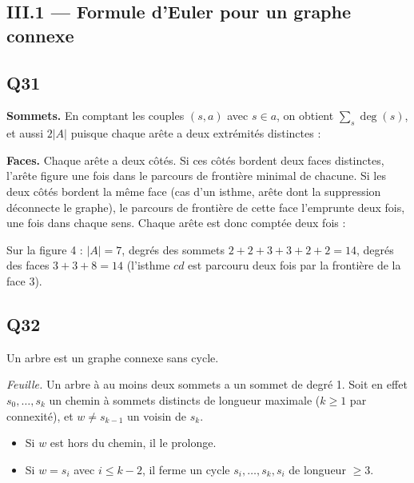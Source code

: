 \documentclass[11pt,a4paper]{article}
\providecommand{\tightlist}{\setlength{\itemsep}{0pt}\setlength{\parskip}{0pt}}
\newcommand{\equationajustee}[1]{%
  \sbox{\boiteequation}{$\displaystyle #1$}%
  \ifdim\wd\boiteequation>\linewidth
    \[\resizebox{\linewidth}{!}{\usebox{\boiteequation}}\]%
  \else
    \[#1\]%
  \fi}
\begin{document}
\hypertarget{iii.1-formule-deuler-pour-un-graphe-connexe}{%
\subsection{III.1 --- Formule d'Euler pour un graphe connexe}\label{iii.1-formule-deuler-pour-un-graphe-connexe}}

\hypertarget{q31}{%
\subsection{Q31}\label{q31}}

\textbf{Sommets.} En comptant les couples \((s, a)\) avec \(s \in a\), on obtient \(\sum_s \deg(s)\), et aussi \(2|A|\) puisque chaque arête a deux extrémités distinctes :

\equationajustee{\boxed{\,\sum_{s \in S} \deg(s) = 2|A|\,}}

\textbf{Faces.} Chaque arête a deux côtés. Si ces côtés bordent deux faces distinctes, l'arête figure une fois dans le parcours de frontière minimal de chacune. Si les deux côtés bordent la même face (cas d'un isthme, arête dont la suppression déconnecte le graphe), le parcours de frontière de cette face l'emprunte deux fois, une fois dans chaque sens. Chaque arête est donc comptée deux fois :

\equationajustee{\boxed{\,\sum_{f \in F} \deg(f) = 2|A|\,}}

Sur la figure 4 : \(|A| = 7\), degrés des sommets \(2 + 2 + 3 + 3 + 2 + 2 = 14\), degrés des faces \(3 + 3 + 8 = 14\) (l'isthme \(cd\) est parcouru deux fois par la frontière de la face 3).

\hypertarget{q32}{%
\subsection{Q32}\label{q32}}

Un arbre est un graphe connexe sans cycle.

\emph{Feuille.} Un arbre à au moins deux sommets a un sommet de degré 1. Soit en effet \(s_0, \dots, s_k\) un chemin à sommets distincts de longueur maximale (\(k \ge 1\) par connexité), et \(w \neq s_{k-1}\) un voisin de \(s_k\).

\begin{itemize}
\tightlist
\item
  Si \(w\) est hors du chemin, il le prolonge.
\item
  Si \(w = s_i\) avec \(i \le k-2\), il ferme un cycle \(s_i, \dots, s_k, s_i\) de longueur \(\ge 3\).
\end{itemize}
\end{document}
